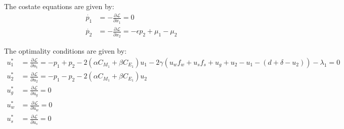 \documentclass[12pt]{article}
\begin{document}
The costate equations are given by:
\begin{align*}
    \dot{p_1} &= -\frac{\partial \mathcal{L}}{\partial x_1} = 0 \\
    \dot{p_2} &= -\frac{\partial \mathcal{L}}{\partial x_2} = -\epsilon p_2 + \mu_1 - \mu_2
\end{align*}

The optimality conditions are given by:
\begin{align*}
    u_1^* &= \frac{\partial \mathcal{L}}{\partial u_1} = -p_1 + p_2 - 2(\alpha C_{M_1} + \beta C_{E_1})u_1 - 2\gamma (u_w f_w + u_s f_s + u_g + u_2 - u_1 - (d + \delta - u_2)) - \lambda_1 = 0 \\
    u_2^* &= \frac{\partial \mathcal{L}}{\partial u_2} = -p_1 - p_2 - 2(\alpha C_{M_1} + \beta C_{E_1})u_2 \\
    u_g^* &= \frac{\partial \mathcal{L}}{\partial u_g} = 0 \\
    u_w^* &= \frac{\partial \mathcal{L}}{\partial u_w} = 0 \\
    u_s^* &= \frac{\partial \mathcal{L}}{\partial u_s} = 0
\end{align*}
\end{document}
